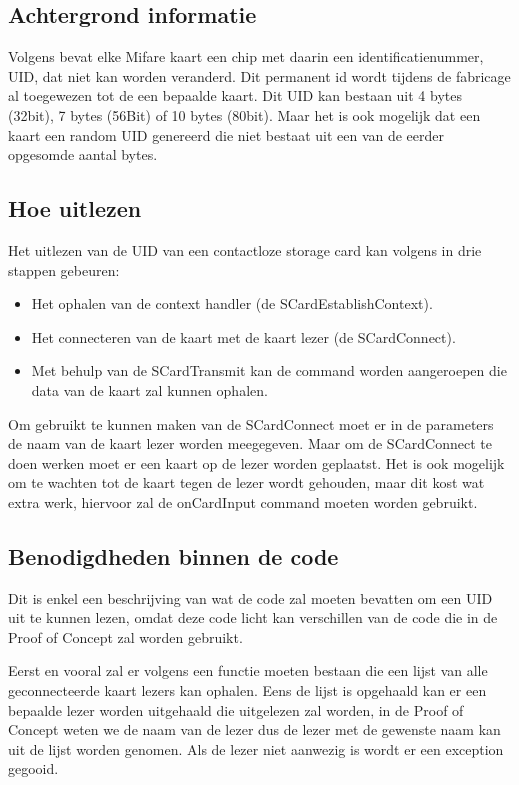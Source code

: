 \subsection{Achtergrond informatie}
Volgens \textcite{SmartcardFocus} bevat elke Mifare kaart een chip met daarin een identificatienummer, UID, dat niet kan worden veranderd. Dit permanent id wordt tijdens de fabricage al toegewezen tot de een bepaalde kaart. Dit UID kan bestaan uit 4 bytes (32bit), 7 bytes (56Bit) of 10 bytes (80bit). Maar het is ook mogelijk dat een kaart een random UID genereerd die niet bestaat uit een van de eerder opgesomde aantal bytes. 

\subsection{Hoe uitlezen}
Het uitlezen van de UID van een contactloze storage card kan volgens \textcite{SmartcardFocus} in drie stappen gebeuren:
\begin{itemize}
    \item Het ophalen van de context handler (de SCardEstablishContext). 
    \item Het connecteren van de kaart met de kaart lezer (de SCardConnect). 
    \item Met behulp van de SCardTransmit kan de command worden aangeroepen die data van de kaart zal kunnen ophalen. 
\end{itemize}
Om gebruikt te kunnen maken van de SCardConnect moet er in de parameters de naam van de kaart lezer worden meegegeven. Maar om de SCardConnect te doen werken moet er een kaart op de lezer worden geplaatst. Het is ook mogelijk om te wachten tot de kaart tegen de lezer wordt gehouden, maar dit kost wat extra werk, hiervoor zal de onCardInput command moeten worden gebruikt.

\subsection{Benodigdheden binnen de code}
Dit is enkel een beschrijving van wat de code zal moeten bevatten om een UID uit te kunnen lezen, omdat deze code licht kan verschillen van de code die in de Proof of Concept zal worden gebruikt. 

Eerst en vooral zal er volgens \textcite{SmartcardFocus} een functie moeten bestaan die een lijst van alle geconnecteerde kaart lezers kan ophalen. Eens de lijst is opgehaald kan er een bepaalde lezer worden uitgehaald die uitgelezen zal worden, in de Proof of Concept weten we de naam van de lezer dus de lezer met de gewenste naam kan uit de lijst worden genomen. Als de lezer niet aanwezig is wordt er een exception gegooid.

